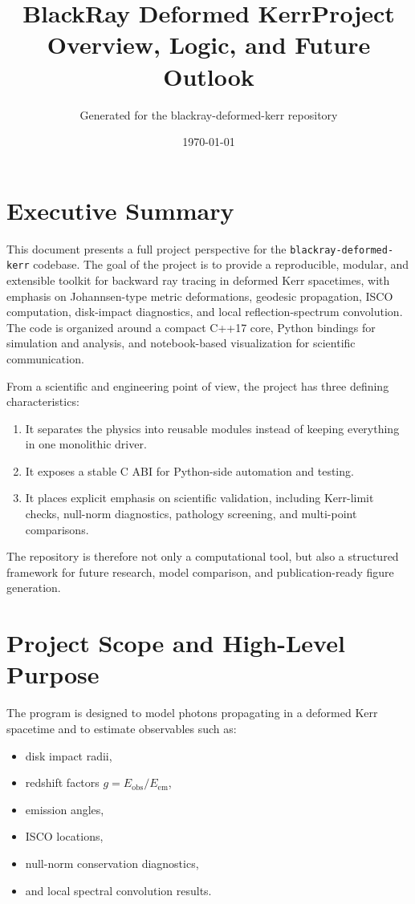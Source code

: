 \documentclass[11pt]{article}
\title{BlackRay Deformed Kerr\newline Project Overview, Logic, and Future Outlook}
\author{Generated for the blackray-deformed-kerr repository}
\date{\today}
\begin{document}
\maketitle

\section*{Executive Summary}

This document presents a full project perspective for the \texttt{blackray-deformed-kerr} codebase. The goal of the project is to provide a reproducible, modular, and extensible toolkit for backward ray tracing in deformed Kerr spacetimes, with emphasis on Johannsen-type metric deformations, geodesic propagation, ISCO computation, disk-impact diagnostics, and local reflection-spectrum convolution. The code is organized around a compact C++17 core, Python bindings for simulation and analysis, and notebook-based visualization for scientific communication.

From a scientific and engineering point of view, the project has three defining characteristics:

\begin{enumerate}[leftmargin=1.5em]
    \item It separates the physics into reusable modules instead of keeping everything in one monolithic driver.
    \item It exposes a stable C ABI for Python-side automation and testing.
    \item It places explicit emphasis on scientific validation, including Kerr-limit checks, null-norm diagnostics, pathology screening, and multi-point comparisons.
\end{enumerate}

The repository is therefore not only a computational tool, but also a structured framework for future research, model comparison, and publication-ready figure generation.

\section{Project Scope and High-Level Purpose}

The program is designed to model photons propagating in a deformed Kerr spacetime and to estimate observables such as:

\begin{itemize}[leftmargin=1.5em]
    \item disk impact radii,
    \item redshift factors $g = E_{\mathrm{obs}}/E_{\mathrm{em}}$,
    \item emission angles,
    \item ISCO locations,
    \item null-norm conservation diagnostics,
    \item and local spectral convolution results.
\end{itemize}
\end{document}
